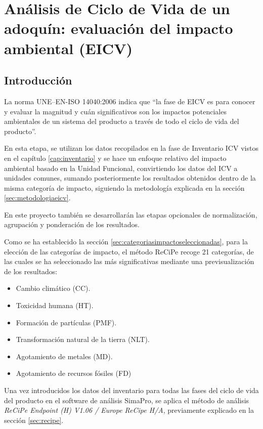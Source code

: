\chapter{Análisis de Ciclo de Vida de un adoquín: evaluación del impacto ambiental (EICV)}

\section{Introducción}
La norma UNE–EN-ISO 14040:2006 indica que ``la fase de EICV es para conocer y evaluar la magnitud y cuán significativos son los impactos potenciales ambientales de un sistema del producto a través de todo el ciclo de vida del producto''.

En esta etapa, se utilizan los datos recopilados en la fase de Inventario ICV vistos en el capítulo \ref{cap:inventario} y se hace un enfoque relativo del impacto ambiental basado en la Unidad Funcional, convirtiendo los datos del ICV a unidades comunes, sumando posteriormente los resultados obtenidos dentro de la misma categoría de impacto, siguiendo la metodología explicada en la sección \ref{sec:metodologiaeicv}.

En este proyecto también se desarrollarán las etapas opcionales de normalización, agrupación y ponderación de los resultados.

Como se ha establecido la sección \ref{sec:categoriasimpactoseleccionadas}, para la elección de las categorías de impacto, el método ReCiPe recoge 21 categorías, de las cuales se ha seleccionado las más significativas mediante una previsualización de los resultados:

\begin{itemize}
  \item Cambio climático (CC).
  \item Toxicidad humana (HT).
  \item Formación de partículas (PMF).
  \item Transformación natural de la tierra (NLT).
  \item Agotamiento de metales (MD).
  \item Agotamiento de recursos fósiles (FD)
\end{itemize}

Una vez introducidos los datos del inventario para todas las fases del ciclo de vida del producto en el software de análisis SimaPro, se aplica el método de análisis \textit{ReCiPe Endpoint (H) V1.06 / Europe ReCipe H/A}, previamente explicado en la sección \ref{sec:recipe}.

